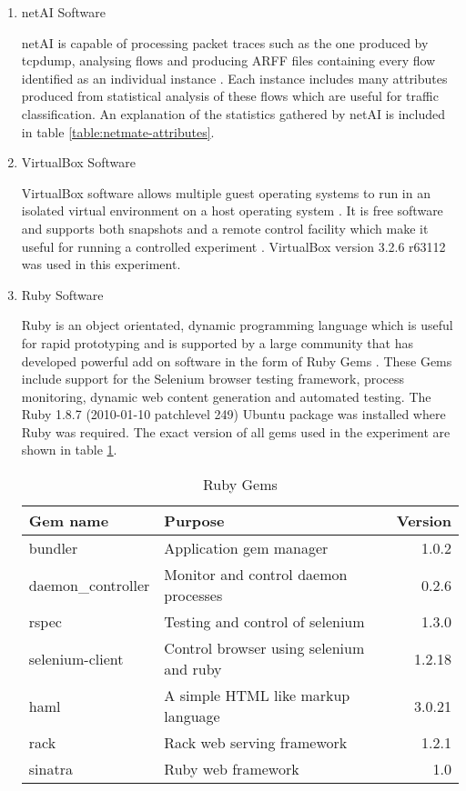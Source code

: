 \begin{enumerate}
  \item netAI Software

  netAI is capable of processing packet traces such as the one produced by
  tcpdump, analysing flows and producing ARFF files containing every flow
  identified as an individual instance \parencite{swinbut:2006fk}. Each instance
  includes many attributes produced from statistical analysis of these flows
  which are useful for traffic classification. An explanation of the statistics
  gathered by netAI is included in table \ref{table:netmate-attributes}.

  \item VirtualBox Software

  VirtualBox software allows multiple guest operating systems to run in an
  isolated virtual environment on a host operating system \parencite{:fk}.
  It is free software and supports both snapshots and a remote control facility
  which make it useful for running a controlled experiment \parencite{Oracle:2011kx}.
  VirtualBox version 3.2.6 r63112 was used in this experiment.

  \item Ruby Software

  Ruby is an object orientated, dynamic programming language which is useful for
  rapid prototyping and is supported by a large community that has developed
  powerful add on software in the form of Ruby Gems \parencite{:2010uq}. These
  Gems include support for the Selenium browser testing framework, process
  monitoring, dynamic web content generation and automated testing. The Ruby
  1.8.7 (2010-01-10 patchlevel 249) Ubuntu package was installed where Ruby was
  required. The exact version of all gems used in the experiment are shown in
  table \ref{table:gems}.

  \begin{center}
    \begin{minipage}[t]{\linewidth}
      \begin{table}[H]
        \begin{tabular}{llr}
          \toprule
          Gem name & Purpose & Version \\
          \midrule
          bundler & Application gem manager & 1.0.2 \\
          daemon\_controller & Monitor and control daemon processes & 0.2.6 \\
          rspec & Testing and control of selenium & 1.3.0 \\
          selenium-client & Control browser using selenium and ruby & 1.2.18 \\
          haml & A simple HTML like markup language & 3.0.21 \\
          rack & Rack web serving framework & 1.2.1 \\
          sinatra & Ruby web framework & 1.0 \\
          \bottomrule
        \end{tabular}
        \caption{Ruby Gems}
        \label{table:gems}
      \end{table}
    \end{minipage}
  \end{center}


\end{enumerate}
